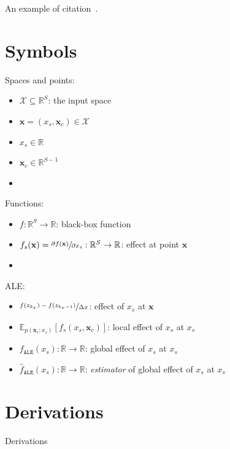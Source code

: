 \documentclass[wcp]{jmlr}
\newcommand{\xc}{\mathbf{x}_c}
\newcommand{\x}{\mathbf{x}}
\newcommand{\E}{\mathbb{E}}
\newcommand{\R}{\mathbb{R}}
\newcommand{\1}{\mathbbm{1}}
\begin{document}
An example of citation~\cite{DBLP:conf/acml/2009}.

\newpage


%

\newpage

\appendix

\section{Symbols}\label{apd:symbols}

Spaces and points:

\begin{itemize}
\item \(\mathcal{X} \subseteq \R^S \): the input space
\item \(\x = (x_s, \xc) \in \mathcal{X}\)
\item \(x_s \in \R \)
\item \(\xc \in \R^{S-1}\)
\item
\end{itemize}
%
Functions:
\begin{itemize}
\item \(f: \R^S \rightarrow \R\): black-box function
\item \(f_s(\x) = \sfrac{\partial f(\x)}{\partial x_s}: \R^S \rightarrow \R\): effect at point \(\x\)
\item 
\end{itemize}
%
ALE:
\begin{itemize}
\item \(\sfrac{f(z_{k_x}) - f(z_{k_x-1})}{\Delta x}\): effect of \(x_s\) at \(\x\)
\item \(\E_{p(\xc;x_s)}[f_s(x_s, \xc)]\): local effect of \(x_s\) at \(x_s\)
\item \(f_{\texttt{ALE}}(x_s): \R \rightarrow \R\): global effect of \(x_s\) at \(x_s\)
\item \(\hat{f}_{\texttt{ALE}}(x_s): \R \rightarrow \R\): \textit{estimator} of global effect of \(x_s\) at \(x_s\)
\end{itemize}

\section{Derivations}\label{apd:derivations}

Derivations
\end{document}
